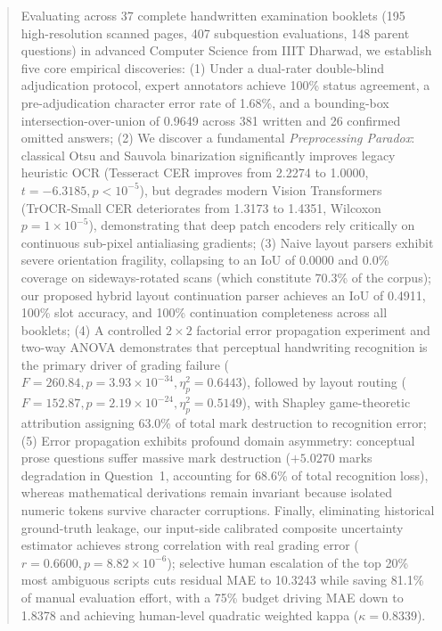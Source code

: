 \documentclass[journal]{IEEEtran}
\begin{document}
\begin{abstract}
Evaluating across 37 complete handwritten examination booklets (195 high-resolution scanned pages, 407 subquestion evaluations, 148 parent questions) in advanced Computer Science from IIIT Dharwad, we establish five core empirical discoveries:
(1) Under a dual-rater double-blind adjudication protocol, expert annotators achieve 100\% status agreement, a pre-adjudication character error rate of 1.68\%, and a bounding-box intersection-over-union of 0.9649 across 381 written and 26 confirmed omitted answers;
(2) We discover a fundamental \textit{Preprocessing Paradox}: classical Otsu and Sauvola binarization significantly improves legacy heuristic OCR (Tesseract CER improves from 2.2274 to 1.0000, $t = -6.3185, p < 10^{-5}$), but degrades modern Vision Transformers (TrOCR-Small CER deteriorates from 1.3173 to 1.4351, Wilcoxon $p = 1 \times 10^{-5}$), demonstrating that deep patch encoders rely critically on continuous sub-pixel antialiasing gradients;
(3) Naive layout parsers exhibit severe orientation fragility, collapsing to an IoU of 0.0000 and 0.0\% coverage on sideways-rotated scans (which constitute 70.3\% of the corpus); our proposed hybrid layout continuation parser achieves an IoU of 0.4911, 100\% slot accuracy, and 100\% continuation completeness across all booklets;
(4) A controlled $2 \times 2$ factorial error propagation experiment and two-way ANOVA demonstrates that perceptual handwriting recognition is the primary driver of grading failure ($F = 260.84, p = 3.93 \times 10^{-34}, \eta_p^2 = 0.6443$), followed by layout routing ($F = 152.87, p = 2.19 \times 10^{-24}, \eta_p^2 = 0.5149$), with Shapley game-theoretic attribution assigning 63.0\% of total mark destruction to recognition error;
(5) Error propagation exhibits profound domain asymmetry: conceptual prose questions suffer massive mark destruction ($+5.0270$ marks degradation in Question~1, accounting for 68.6\% of total recognition loss), whereas mathematical derivations remain invariant because isolated numeric tokens survive character corruptions.
Finally, eliminating historical ground-truth leakage, our input-side calibrated composite uncertainty estimator achieves strong correlation with real grading error ($r = 0.6600, p = 8.82 \times 10^{-6}$); selective human escalation of the top 20\% most ambiguous scripts cuts residual MAE to 10.3243 while saving 81.1\% of manual evaluation effort, with a 75\% budget driving MAE down to 1.8378 and achieving human-level quadratic weighted kappa ($\kappa = 0.8339$).
\end{abstract}
\end{document}

